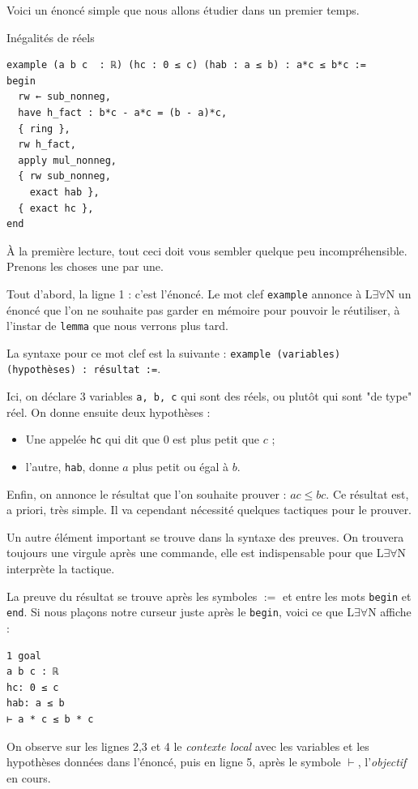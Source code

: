 \documentclass[a4paper, 11pt, twoside]{report}
\newcommand{\LEAN}{L$\exists\forall$N }
\begin{document}
Voici un énoncé simple que nous allons étudier dans un premier temps.

\begin{code}{Inégalités de réels}
\begin{lstlisting}
example (a b c  : ℝ) (hc : 0 ≤ c) (hab : a ≤ b) : a*c ≤ b*c :=
begin
  rw ← sub_nonneg,
  have h_fact : b*c - a*c = (b - a)*c,
  { ring },
  rw h_fact,
  apply mul_nonneg,
  { rw sub_nonneg,
    exact hab },
  { exact hc },
end 
\end{lstlisting}
\end{code}

À la première lecture, tout ceci doit vous sembler quelque peu incompréhensible. Prenons les choses une par une.

Tout d'abord, la ligne 1 : c'est l'énoncé. Le mot clef \verb|example| annonce à \LEAN un énoncé que l'on ne souhaite pas garder en mémoire pour pouvoir le réutiliser, à l'instar de \verb|lemma| que nous verrons plus tard. 

La syntaxe pour ce mot clef est la suivante : \verb|example (variables) (hypothèses) : résultat :=|. 

Ici, on déclare 3 variables \verb|a, b, c| qui sont des réels, ou plutôt qui sont "de type" réel. On donne ensuite deux hypothèses :
\begin{itemize}
	\item Une appelée \verb|hc| qui dit que $0$ est plus petit que $c$ ;
	\item l'autre, \verb|hab|, donne $a$ plus petit ou égal à $b$.
\end{itemize}
Enfin, on annonce le résultat que l'on souhaite prouver : $ac\leq bc$. Ce résultat est, a priori, très simple. Il va cependant nécessité quelques tactiques pour le prouver.

Un autre élément important se trouve dans la syntaxe des preuves. On trouvera toujours une virgule après une commande, elle est indispensable pour que \LEAN interprète la tactique.

La preuve du résultat se trouve après les symboles $:=$ et entre les mots \verb|begin| et \verb|end|. Si nous plaçons notre curseur juste après le \verb|begin|, voici ce que \LEAN affiche :

\begin{lstlisting}
1 goal
a b c : ℝ
hc: 0 ≤ c
hab: a ≤ b
⊢ a * c ≤ b * c
\end{lstlisting}


On observe sur les lignes 2,3 et 4 le \textit{contexte local} avec les variables et les hypothèses données dans l'énoncé, puis en ligne 5, après le symbole $\vdash$, l'\textit{objectif} en cours.
\end{document}
